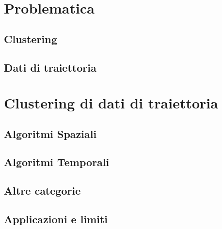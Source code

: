 
\section{Problematica}\label{sec:problem}


\subsection{Clustering}\label{subsec:problem:clustering}


\subsection{Dati di traiettoria}\label{subsec:problem:trajectorydata}


\section{Clustering di dati di traiettoria}\label{sec:problem:trajectoryclustering}


\subsection{Algoritmi Spaziali}\label{subsec:problem:spatialalgorithms}


\subsection{Algoritmi Temporali}\label{subsec:problem:temporalalgorithms}


\subsection{Altre categorie}\label{subsec:problem:othersalgorithms}


\subsection{Applicazioni e limiti}\label{subsec:problem:applicationandlimits}


